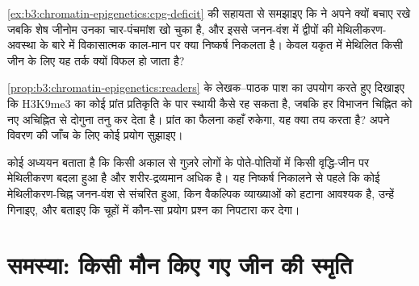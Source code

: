 \begin{exercise}[$\star\star\star$]\label{exo:b3:chromatin-epigenetics:10}
\cref{ex:b3:chromatin-epigenetics:cpg-deficit} की सहायता से समझाइए कि
 ने अपने  क्यों बचाए रखे जबकि शेष जीनोम उनका
चार-पंचमांश खो चुका है, और इससे जनन-वंश में द्वीपों की
मेथिलीकरण-अवस्था के बारे में विकासात्मक काल-मान पर क्या निष्कर्ष
निकलता है। केवल यकृत में मेथिलित किसी जीन के लिए यह तर्क क्यों विफल
हो जाता है?
\end{exercise}

\begin{exercise}[$\star\star\star$]\label{exo:b3:chromatin-epigenetics:11}
\cref{prop:b3:chromatin-epigenetics:readers} के लेखक--पाठक पाश का
उपयोग करते हुए दिखाइए कि H3K9me3 का कोई प्रांत प्रतिकृति के पार स्थायी
कैसे रह सकता है, जबकि हर विभाजन चिह्नित  को नए अचिह्नित
 से दोगुना तनु कर देता है। प्रांत का फैलना कहाँ रुकेगा, यह
क्या तय करता है? अपने विवरण की जाँच के लिए कोई प्रयोग सुझाइए।
\end{exercise}

\begin{exercise}[$\star\star\star$]\label{exo:b3:chromatin-epigenetics:12}
कोई अध्ययन बताता है कि किसी अकाल से गुज़रे लोगों के पोते-पोतियों में
किसी वृद्धि-जीन पर मेथिलीकरण बदला हुआ है और शरीर-द्रव्यमान अधिक है। यह
निष्कर्ष निकालने से पहले कि कोई मेथिलीकरण-चिह्न जनन-वंश से संचरित हुआ,
किन वैकल्पिक व्याख्याओं को हटाना आवश्यक है, उन्हें गिनाइए, और बताइए कि
चूहों में कौन-सा प्रयोग प्रश्न का निपटारा कर देगा।
\end{exercise}

\section{समस्या: किसी मौन किए गए जीन की स्मृति}

